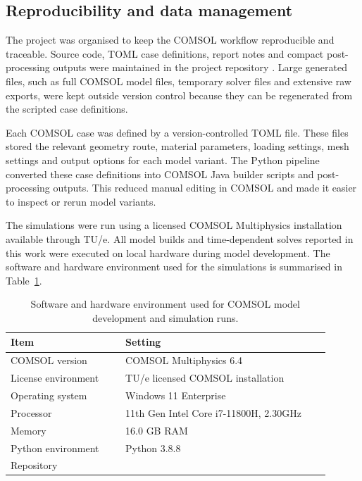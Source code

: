 

\subsection{Reproducibility and data management}
\label{reproducibility_and_data_management}

The project was organised to keep the COMSOL workflow reproducible and traceable. Source code, TOML case definitions, report notes and compact post-processing outputs were maintained in the project repository \cite{KuijpersEWSComsolGitHub}. Large generated files, such as full COMSOL model files, temporary solver files and extensive raw exports, were kept outside version control because they can be regenerated from the scripted case definitions.

Each COMSOL case was defined by a version-controlled TOML file. These files stored the relevant geometry route, material parameters, loading settings, mesh settings and output options for each model variant. The Python pipeline converted these case definitions into COMSOL Java builder scripts and post-processing outputs. This reduced manual editing in COMSOL and made it easier to inspect or rerun model variants.

The simulations were run using a licensed COMSOL Multiphysics installation available through TU/e. All model builds and time-dependent solves reported in this work were executed on local hardware during model development. The software and hardware environment used for the simulations is summarised in Table~\ref{software_hardware_environment_table}.

\begin{table}[H]
\centering
\small
\caption{Software and hardware environment used for COMSOL model development and simulation runs.}
\label{software_hardware_environment_table}
\begin{tabular}{p{0.32\linewidth} p{0.58\linewidth}}
\toprule
Item & Setting \\
\midrule
COMSOL version & COMSOL Multiphysics 6.4 \\
License environment & TU/e licensed COMSOL installation \\
Operating system & Windows 11 Enterprise \\
Processor & 11th Gen Intel Core i7-11800H, 2.30GHz \\
Memory & 16.0 GB RAM \\
Python environment & Python 3.8.8 \\
Repository & \cite{KuijpersEWSComsolGitHub} \\
\bottomrule
\end{tabular}
\end{table}
